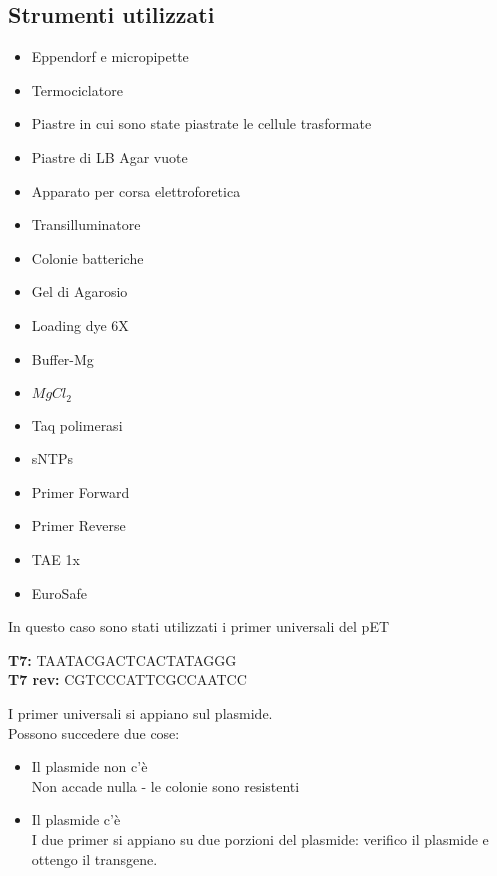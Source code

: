 \documentclass{extarticle}
\begin{document}
\subsection*{Strumenti utilizzati}
\begin{minipage}{0.50\textwidth}
    \begin{itemize}
        \item Eppendorf e micropipette
        \item Termociclatore
        \item Piastre in cui sono state piastrate le cellule trasformate
        \item Piastre di LB Agar vuote
        \item Apparato per corsa elettroforetica
        \item Transilluminatore
        \item Colonie batteriche
        \item Gel di Agarosio
        \item Loading dye 6X
    \end{itemize}
\end{minipage} \hfill
\begin{minipage}{0.50\textwidth} 
    \begin{itemize}
        \item Buffer-Mg
        \item $MgCl_{2}$
        \item Taq polimerasi
        \item sNTPs
        \item Primer Forward
        \item Primer Reverse
        \item TAE 1x
        \item EuroSafe
    \end{itemize}
\end{minipage}
In questo caso sono stati utilizzati i primer universali del pET\\
\begin{center}
    \textbf{T7:} TAATACGACTCACTATAGGG\\
    \textbf{T7 rev:} CGTCCCATTCGCCAATCC\\
\end{center}
I primer universali si appiano sul plasmide.\\
Possono succedere due cose:
\begin{itemize}
    \item Il plasmide non c'è\\
    Non accade nulla - le colonie sono resistenti
    \item Il plasmide c'è\\
    I due primer si appiano su due porzioni del plasmide: verifico il plasmide e ottengo il transgene.
\end{itemize}
\end{document}
